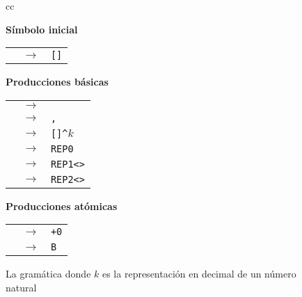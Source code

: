 \renewcommand{\thefigure}{PI.3}
\begin{figure}
\begin{center}
\begin{tabular}{cc}

    \begin{minipage}[t]{0.35\textwidth}
    {\bf Símbolo inicial}

    \medskip

    \begin{tabular}{rcl}
    \start & $\to$ & \verb#[#\inst\verb#]# %
    \end{tabular}

    \bigskip

    {\bf Producciones básicas}

    \medskip

    \begin{tabular}{rcl}
    \inst  & $\to$ & \atom %
    \\
    \inst  & $\to$ & \inst\verb#,#\inst %
    \\
    \inst  & $\to$ & \rep\verb#[#\inst\verb#]^#$k$%
    \\
    \rep  & $\to$ & \verb#REP0# %
    \\

    \rep  & $\to$ & \verb#REP1<#\atom\verb#># %
    \\
    \rep  & $\to$ & \verb#REP2<#\atom\verb#># %
    \\
    \end{tabular}
    \end{minipage}
    
    \begin{minipage}[t]{0.35\textwidth}

    {\bf Producciones atómicas}

    \medskip

    \begin{tabular}{rcl}    \\
    \atom  & $\to$ & \verb#+0# %
    \\
    \atom  & $\to$ & \verb#B # %
    \end{tabular}
    \end{minipage}
\end{tabular}
\end{center}
\caption{La gramática \grambin donde $k$ es la representación en decimal de un número natural}
\label{fig:grambin}
\end{figure}

